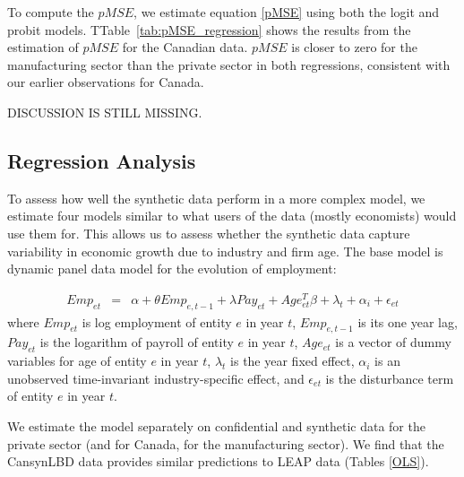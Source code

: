 To compute the $pMSE$, we estimate equation \ref{pMSE} using both the logit and probit models. TTable~\ref{tab:pMSE_regression} shows the results from the estimation of $pMSE$ for the Canadian data.
$pMSE$ is closer to zero for the manufacturing sector than the private sector in both regressions, consistent with our earlier observations for Canada.


DISCUSSION IS STILL MISSING.

\subsection{Regression Analysis}

To assess how well the synthetic data perform in a more complex model, we estimate four models similar to what users of the data (mostly economists) would use them for. This allows us to assess whether the synthetic data capture variability in economic growth due to industry and firm age.
The base model is  dynamic panel data model for the evolution of employment:

\begin{eqnarray}	
\label{eq:OLS}
Emp_{et} & = & \alpha + \theta Emp_{e,t-1} + \lambda Pay_{et} + Age_{et}^{T}\beta + \lambda_t + \alpha_i + \epsilon_{et}
\end{eqnarray}
where $Emp_{et}$ is log employment of entity $e$ in year $t$, $Emp_{e,t-1}$ is its one year lag, $Pay_{et}$ is the logarithm of payroll of entity $e$ in year $t$, $Age_{et}$ is a vector of dummy variables for age of entity $e$ in year $t$, $\lambda_t$ is the year fixed effect, $\alpha_i$ is an unobserved time-invariant industry-specific effect, and $\epsilon_{et}$ is the disturbance term of entity $e$ in year $t$. 

We estimate the model separately on confidential and synthetic data for the private sector (and for Canada, for the manufacturing sector). We find that the CansynLBD data provides similar predictions to LEAP data (Tables  \ref{OLS}). 




